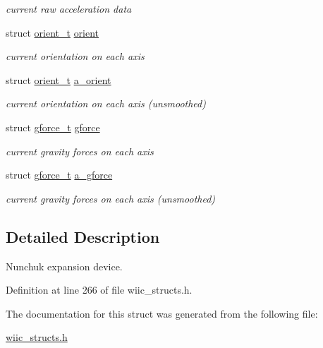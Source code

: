 \begin{DoxyCompactItemize}
\begin{DoxyCompactList}\small\item\em current raw acceleration data \end{DoxyCompactList}\item 
\hypertarget{structnunchuk__t_a24ca076b817418f2e2c1507965256b45}{struct \hyperlink{structorient__t}{orient\-\_\-t} \hyperlink{structnunchuk__t_a24ca076b817418f2e2c1507965256b45}{orient}}\label{structnunchuk__t_a24ca076b817418f2e2c1507965256b45}

\begin{DoxyCompactList}\small\item\em current orientation on each axis \end{DoxyCompactList}\item 
\hypertarget{structnunchuk__t_a6efb9dfa3391cb3815d6a1741cb4525b}{struct \hyperlink{structorient__t}{orient\-\_\-t} \hyperlink{structnunchuk__t_a6efb9dfa3391cb3815d6a1741cb4525b}{a\-\_\-orient}}\label{structnunchuk__t_a6efb9dfa3391cb3815d6a1741cb4525b}

\begin{DoxyCompactList}\small\item\em current orientation on each axis (unsmoothed) \end{DoxyCompactList}\item 
\hypertarget{structnunchuk__t_a79d598a365f147ca23c67e592776fde0}{struct \hyperlink{structgforce__t}{gforce\-\_\-t} \hyperlink{structnunchuk__t_a79d598a365f147ca23c67e592776fde0}{gforce}}\label{structnunchuk__t_a79d598a365f147ca23c67e592776fde0}

\begin{DoxyCompactList}\small\item\em current gravity forces on each axis \end{DoxyCompactList}\item 
\hypertarget{structnunchuk__t_a50d07c79c66f167b7fdb7ee56f173516}{struct \hyperlink{structgforce__t}{gforce\-\_\-t} \hyperlink{structnunchuk__t_a50d07c79c66f167b7fdb7ee56f173516}{a\-\_\-gforce}}\label{structnunchuk__t_a50d07c79c66f167b7fdb7ee56f173516}

\begin{DoxyCompactList}\small\item\em current gravity forces on each axis (unsmoothed) \end{DoxyCompactList}\end{DoxyCompactItemize}


\subsection{Detailed Description}
Nunchuk expansion device. 

Definition at line 266 of file wiic\-\_\-structs.\-h.



The documentation for this struct was generated from the following file\-:\begin{DoxyCompactItemize}
\item 
\hyperlink{wiic__structs_8h}{wiic\-\_\-structs.\-h}\end{DoxyCompactItemize}
